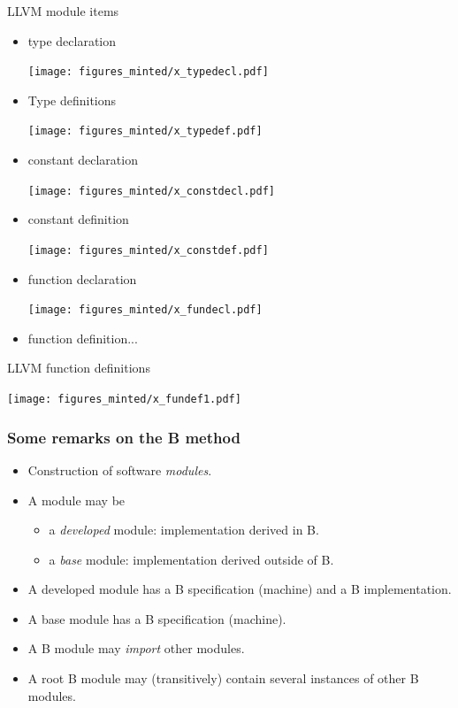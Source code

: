 \documentclass[12pt]{beamer}
\begin{document}
\begin{frame}{LLVM module items}

\begin{itemize}
\item type declaration

\noindent\texttt{[image: figures\_minted/x\_typedecl.pdf]}
\item Type definitions

\noindent\texttt{[image: figures\_minted/x\_typedef.pdf]}
\item constant declaration

\noindent\texttt{[image: figures\_minted/x\_constdecl.pdf]}
\item constant definition

\noindent\texttt{[image: figures\_minted/x\_constdef.pdf]}
\item function declaration

\noindent\texttt{[image: figures\_minted/x\_fundecl.pdf]}

\item function definition...
\end{itemize}

\end{frame}

\begin{frame}{LLVM function definitions}

\noindent\texttt{[image: figures\_minted/x\_fundef1.pdf]}

\end{frame}

\begin{frame}

  \frametitle{Some remarks on the B method}
	
  \begin{itemize}
  \item Construction of software \emph{modules\/}.
  \item A module may be
    \begin{itemize}
    \item a \emph{developed} module: implementation derived in B.
    \item a \emph{base} module: implementation derived outside of B.
    \end{itemize}
  \item A developed module has a B specification (machine) and a B
    implementation.
  \item A base module has a B specification (machine).
  \item A B module may \emph{import} other modules.
  \item A root B module may (transitively) contain several instances of other
    B modules.
  \end{itemize}

\end{frame}
\end{document}
